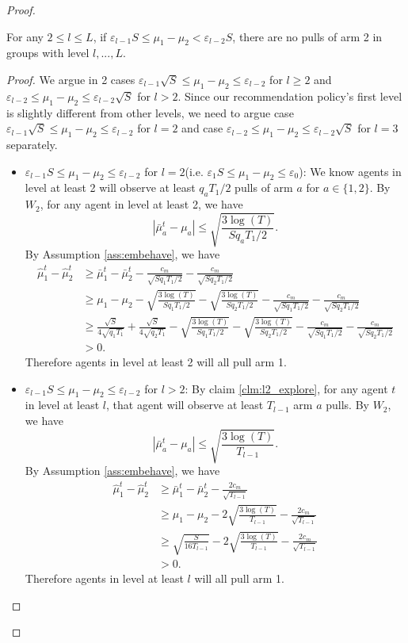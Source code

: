 \begin{proof}
\begin{claim}
\label{clm:l2_exploit}
For any $2 \leq l \leq L$, if $\varepsilon_{l-1} S\leq \mu_1 - \mu_2 < \varepsilon_{l-2} S$, there are no pulls of arm 2 in groups with level $l,...,L$. 
\end{claim}

\begin{proof}
We argue in 2 cases $\varepsilon_{l-1} \sqrt{S} \leq \mu_1 - \mu_2 \leq \varepsilon_{l-2}$ for $l \geq 2$ and $\varepsilon_{l-2}  \leq \mu_1 - \mu_2 \leq \varepsilon_{l-2} \sqrt{S}$ for $l > 2$. Since our recommendation policy's first level is slightly different from other levels, we need to argue case $\varepsilon_{l-1} \sqrt{S} \leq \mu_1 - \mu_2 \leq \varepsilon_{l-2}$ for $l=2$ and case $\varepsilon_{l-2}  \leq \mu_1 - \mu_2 \leq \varepsilon_{l-2} \sqrt{S}$ for $l =3$ separately.

\begin{itemize}
\item $\varepsilon_{l-1} S \leq \mu_1 - \mu_2 \leq \varepsilon_{l-2}$ for $l = 2$(i.e. $\varepsilon_1S\leq \mu_1 - \mu_2 \leq \varepsilon_0$): We know agents in level at least 2 will observe at least $q_aT_1/2$ pulls of arm $a$ for $a \in \{1,2\}$. By $W_2$, for any agent in level at least 2, we have
\[
|\bar{\mu}_a^t - \mu_a| \leq \sqrt{\frac{3\log(T)}{Sq_aT_1/2}}.
\]
By Assumption \ref{ass:embehave}, we have
\begin{align*}
\hat{\mu}_1^t - \hat{\mu}_2^t &\geq \bar{\mu}_1^t - \bar{\mu}_2^t - \frac{c_m}{\sqrt{Sq_1T_1/2}} -  \frac{c_m}{\sqrt{Sq_2T_1/2}}\\
&\geq \mu_1 -\mu_2-\sqrt{\frac{3\log(T)}{Sq_1T_1/2}} - \sqrt{\frac{3\log(T)}{Sq_2T_1/2}}- \frac{c_m}{\sqrt{Sq_1T_1/2}} -  \frac{c_m}{\sqrt{Sq_2T_1/2}}\\
&\geq\frac{\sqrt{S}}{4\sqrt{q_1T_1}} +  \frac{\sqrt{S}}{4\sqrt{q_2T_1}}-\sqrt{\frac{3\log(T)}{Sq_1T_1/2}} - \sqrt{\frac{3\log(T)}{Sq_2T_1/2}}- \frac{c_m}{\sqrt{Sq_1T_1/2}} -  \frac{c_m}{\sqrt{Sq_2T_1/2}}\\
&>0.
\end{align*}
Therefore agents in level at least 2 will all pull arm 1. 

\item $\varepsilon_{l-1} S \leq \mu_1 - \mu_2 \leq \varepsilon_{l-2}$ for $l > 2$: By claim \ref{clm:l2_explore}, for any agent $t$ in level at least $l$, that agent will observe at least $T_{l-1}$ arm $a$ pulls. By $W_2$, we have
\[
|\bar{\mu}_a^t - \mu_a| \leq \sqrt{\frac{3\log(T)}{T_{l-1}}}.
\]
By Assumption \ref{ass:embehave}, we have
\begin{align*}
\hat{\mu}_1^t - \hat{\mu}_2^t &\geq \bar{\mu}_1^t - \bar{\mu}_2^t - \frac{2c_m}{\sqrt{T_{l-1}}} \\
&\geq \mu_1 -\mu_2 - 2 \sqrt{\frac{3\log(T)}{T_{l-1}}}- \frac{2c_m}{\sqrt{T_{l-1}}} \\
&\geq\sqrt{\frac{S}{16T_{l-1}}} -  2 \sqrt{\frac{3\log(T)}{T_{l-1}}}- \frac{2c_m}{\sqrt{T_{l-1}}} \\
&>0.
\end{align*}
Therefore agents in level at least $l$ will all pull arm 1. 


\end{itemize}
\end{proof}
\end{proof}
